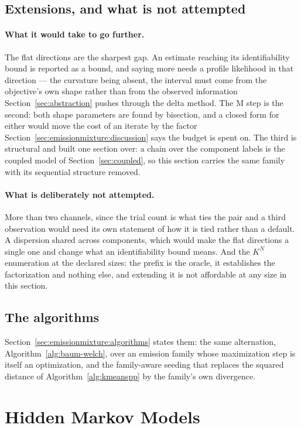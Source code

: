 \documentclass[11pt,a4paper]{article}
\begin{document}
\subsection{Extensions, and what is not attempted}
\label{sec:emissionmixture:extensions}
\paragraph{What it would take to go further.}
The flat directions are the sharpest gap. An estimate reaching its
identifiability bound is reported as a bound, and saying more needs a profile
likelihood in that direction --- the curvature being absent, the interval must
come from the objective's own shape rather than from the observed information
Section~\ref{sec:abstraction} pushes through the delta method. The M step is
the second: both shape parameters are found by bisection, and a closed form for
either would move the cost of an iterate by the factor
Section~\ref{sec:emissionmixture:discussion} says the budget is spent on. The
third is structural and built one section over: a chain over the component
labels is the coupled model of Section~\ref{sec:coupled}, so this section
carries the same family with its sequential structure removed.

\paragraph{What is deliberately not attempted.}
More than two channels, since the trial count is what ties the pair and a
third observation would need its own statement of how it is tied rather than a
default. A dispersion shared across components, which would make the flat
directions a single one and change what an identifiability bound means. And
the $K^N$ enumeration at the declared sizes: the prefix is the oracle, it
establishes the factorization and nothing else, and extending it is not
affordable at any size in this section.

\subsection{The algorithms}
Section~\ref{sec:emissionmixture:algorithms} states them: the
same alternation, Algorithm~\ref{alg:baum-welch}, over an emission family whose
maximization step is itself an optimization, and the family-aware seeding that
replaces the squared distance of Algorithm~\ref{alg:kmeanspp} by the family's
own divergence.

\section{Hidden Markov Models}
\label{sec:hmm}
\end{document}
